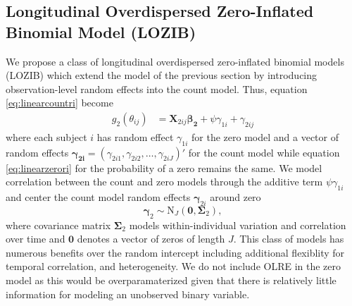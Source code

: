 \documentclass[12pt]{article}
\begin{document}
\subsection{Longitudinal Overdispersed Zero-Inflated Binomial Model (LOZIB)}

We propose a class of longitudinal overdispersed zero-inflated binomial models (LOZIB) which extend the model of the previous section by introducing observation-level random effects into the count model. Thus, equation \eqref{eq:linearcountri} become
\begin{align}
	g_{2}( \theta_{ij}) &= \bm{X}_{2ij} \bm{\beta_{2}} + \psi \gamma_{1i} + \gamma_{2ij} \label{eq:linearcountOLRE}
\end{align}
where each subject $i$ has random effect $\gamma_{1i}$ for the zero model and a vector of random effects $\bm{\gamma_{2i}}= (\gamma_{2i1}, \gamma_{2i2}, \dots, \gamma_{2iJ})' $ for the count model while equation \eqref{eq:linearzerori} for the probability of a zero remains the same.  We model correlation between the count and zero models through the additive term $\psi \gamma_{1i}$ and center the count model random effects $\bm{\gamma}_{2i}$ around zero
\begin{equation}
	\bm{\gamma}_{2} \sim \text{N}_{J} (\bm{0}, \bm{\Sigma}_{2}),\label{eq:count_olre_dist}
\end{equation}
where covariance matrix $\bm{\Sigma}_{2}$ models within-individual variation and correlation over time and $\bm{0}$ denotes a vector of zeros of length $J$. This class of models has numerous benefits over the random intercept including additional flexiblity for temporal correlation, and heterogeneity. We do not include OLRE in the zero model as this would be overparamaterized given that there is relatively little information for modeling an unobserved binary variable.
\end{document}
